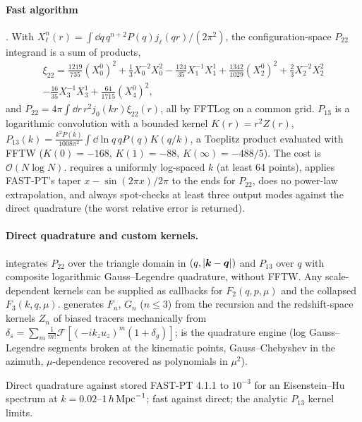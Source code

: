 \paragraph*{Fast algorithm} \cite{Schmittfull2016,McEwen2016}. With
$X_\ell^n(r)=\int\dd q\,q^{n+2}P(q)j_\ell(qr)/(2\pi^2)$, the configuration-space $P_{22}$ integrand is a sum of
products,
\begin{multline}
\xi_{22}=\tfrac{1219}{735}(X_0^0)^2+\tfrac13X_0^{-2}X_0^2-\tfrac{124}{35}X_1^{-1}X_1^1+\tfrac{1342}{1029}(X_2^0)^2
+\tfrac23X_2^{-2}X_2^2\\-\tfrac{16}{35}X_3^{-1}X_3^1+\tfrac{64}{1715}(X_4^0)^2,
\end{multline}
and $P_{22}=4\pi\int\dd r\,r^2j_0(kr)\xi_{22}(r)$, all by FFTLog on a common grid. $P_{13}$ is a logarithmic
convolution with a bounded kernel $K(r)=r^2Z(r)$,
$P_{13}(k)=\frac{k^2P(k)}{1008\pi^2}\int\dd\ln q\,qP(q)K(q/k)$, a Toeplitz product evaluated with FFTW
($K(0)=-168$, $K(1)=-88$, $K(\infty)=-488/5$). The cost is $\mathcal O(N\log N)$.  requires a
uniformly log-spaced $k$ (at least 64 points), applies FAST-PT's taper $x-\sin(2\pi x)/2\pi$ to the ends for $P_{22}$,
does no power-law extrapolation, and always spot-checks at least three output modes against the direct quadrature
(the worst relative error is returned).

\paragraph*{Direct quadrature and custom kernels.}  integrates $P_{22}$ over the triangle domain
in $(q,|\bm{k}-\bm{q}|)$ and $P_{13}$ over $q$ with composite logarithmic Gauss--Legendre quadrature, without FFTW. Any
scale-dependent kernels can be supplied as callbacks for $F_2(q,p,\mu)$ and the collapsed $F_3(k,q,\mu)$.
 generates $F_n$, $G_n$ ($n\le3$) from the recursion and the redshift-space kernels $Z_n$ of biased
tracers mechanically from $\delta_s=\sum_m\frac{1}{m!}\mathcal F[(-ik_zu_z)^m(1+\delta_g)]$;  is the
quadrature engine (log Gauss--Legendre segments broken at the kinematic points, Gauss--Chebyshev in the azimuth,
$\mu$-dependence recovered as polynomials in $\mu^2$).

\begin{validation}
Direct quadrature against stored FAST-PT 4.1.1  to $10^{-3}$ for an Eisenstein--Hu spectrum at
$k=0.02$--$1\,h\,\mathrm{Mpc}^{-1}$; fast against direct; the analytic $P_{13}$ kernel limits.
\end{validation}


